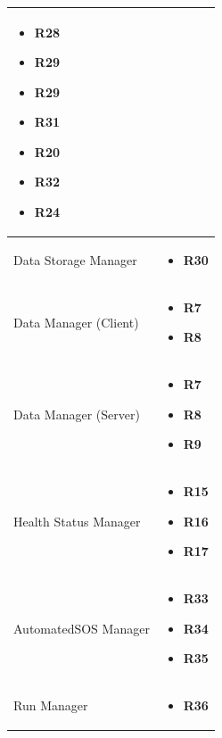 \documentclass[titlepage]{article}
\begin{document}
\begin{longtable}{ p{5 cm} | p{8 cm} }
\begin{itemize}
			\item {\bf R28} 
			\item {\bf R29} 
			\item {\bf R29} 
			\item {\bf R31} 
			\item {\bf R20} 
			\item {\bf R32} 
			\item {\bf R24} 
		\end{itemize}		
		\\	 \hline
		\newline Data Storage Manager & 
		\begin{itemize}
			\item {\bf R30} 
		\end{itemize}		
		\\	 \hline	
		\newline Data Manager (Client) & 
		\begin{itemize}
			\item {\bf R7} 
			\item {\bf R8} 
		\end{itemize}		
		\\	 \hline	
		\newline Data Manager (Server) & 
		\begin{itemize}
			\item {\bf R7} 
			\item {\bf R8} 
			\item {\bf R9} 
		\end{itemize}		
		\\	 \hline	
		\newline Health Status Manager & 
		\begin{itemize}
			\item {\bf R15} 
			\item {\bf R16} 
			\item {\bf R17} 
		\end{itemize}		
		\\	 \hline
		\newline AutomatedSOS Manager & 
		\begin{itemize}
			\item {\bf R33} 
			\item {\bf R34} 
			\item {\bf R35} 
		\end{itemize}		
		\\	 \hline
		\newline Run Manager & 
		\begin{itemize}
			\item {\bf R36} 

\end{itemize}
\end{longtable}
\end{document}
